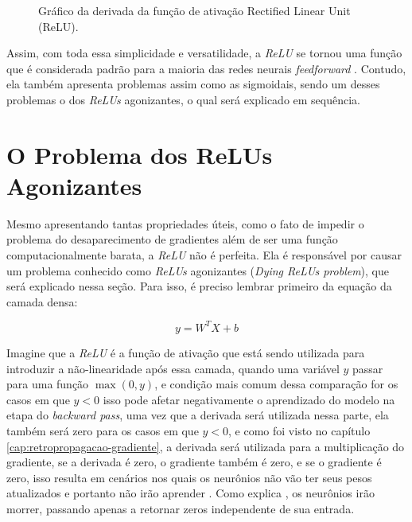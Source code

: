 \begin{figure}[h!] %
    \centering %
        \caption{Gráfico da derivada da função de ativação Rectified Linear Unit (ReLU).}
    \label{fig:relu-derivada}
\end{figure}

Assim, com toda essa simplicidade e versatilidade, a \textit{ReLU} se tornou uma função que é considerada padrão para a maioria das redes neurais \textit{feedforward} \parencite{DeepLearningBook}. Contudo, ela também apresenta problemas assim como as sigmoidais, sendo um desses problemas o dos \textit{ReLUs} agonizantes, o qual será explicado em sequência.

\section{O Problema dos ReLUs Agonizantes}

Mesmo apresentando tantas propriedades úteis, como o fato de impedir o problema do desaparecimento de gradientes além de ser uma função computacionalmente barata, a \textit{ReLU} não é perfeita. Ela é responsável por causar um problema conhecido como \textit{ReLUs} agonizantes (\textit{Dying ReLUs problem}), que será explicado nessa seção. Para isso, é preciso lembrar primeiro da equação da camada densa:

\[
    y = W^T  X + b
\]

Imagine que a \textit{ReLU} é a função de ativação que está sendo utilizada para introduzir a não-linearidade após essa camada, quando uma variável $y$ passar para uma função $\max(0, y)$, e condição mais comum dessa comparação for os casos em que $y < 0$ isso pode afetar negativamente o aprendizado do modelo na etapa do \textit{backward pass}, uma vez que a derivada será utilizada nessa parte, ela também será zero para os casos em que $y < 0$, e como foi visto no capítulo \ref{cap:retropropagacao-gradiente}, a derivada será utilizada para a multiplicação do gradiente, se a derivada é zero, o gradiente também é zero, e se o gradiente é zero, isso resulta em cenários nos quais os neurônios não vão ter seus pesos atualizados e portanto não irão aprender \parencite{DyingReluDouglas}. Como explica \textcite{DyingReluDouglas}, os neurônios irão morrer, passando apenas a retornar zeros independente de sua entrada.

